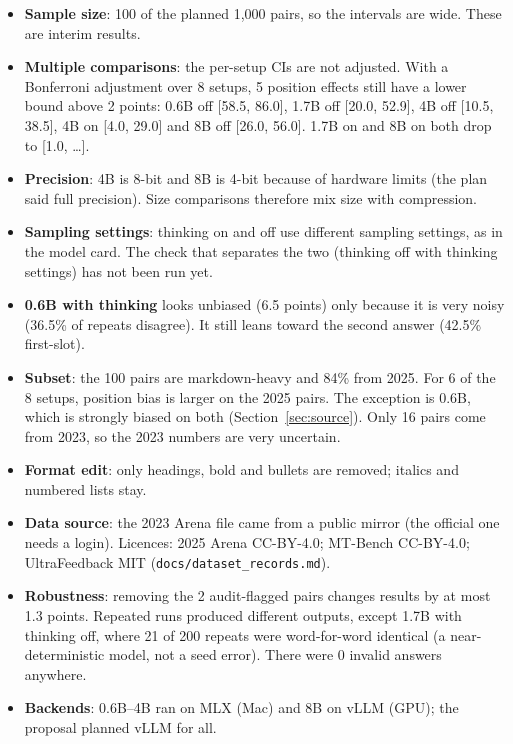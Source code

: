 \documentclass[10.5pt]{article}
\begin{document}
\begin{itemize}
\item \textbf{Sample size}: 100 of the planned 1{,}000 pairs, so the intervals are wide. These are interim results.
\item \textbf{Multiple comparisons}: the per-setup CIs are not adjusted. With a Bonferroni adjustment over 8 setups,
5 position effects still have a lower bound above 2 points: 0.6B off [58.5, 86.0], 1.7B off [20.0, 52.9], 4B off
[10.5, 38.5], 4B on [4.0, 29.0] and 8B off [26.0, 56.0]. 1.7B on and 8B on both drop to [1.0, \ldots].
\item \textbf{Precision}: 4B is 8-bit and 8B is 4-bit because of hardware limits (the plan said full precision).
Size comparisons therefore mix size with compression.
\item \textbf{Sampling settings}: thinking on and off use different sampling settings, as in the model card. The
check that separates the two (thinking off with thinking settings) has not been run yet.
\item \textbf{0.6B with thinking} looks unbiased (6.5 points) only because it is very noisy (36.5\% of repeats
disagree). It still leans toward the second answer (42.5\% first-slot).
\item \textbf{Subset}: the 100 pairs are markdown-heavy and 84\% from 2025. For 6 of the 8 setups, position bias
is larger on the 2025 pairs. The exception is 0.6B, which is strongly biased on both (Section~\ref{sec:source}).
Only 16 pairs come from 2023, so the 2023 numbers are very uncertain.
\item \textbf{Format edit}: only headings, bold and bullets are removed; italics and numbered lists stay.
\item \textbf{Data source}: the 2023 Arena file came from a public mirror (the official one needs a login). Licences:
2025 Arena CC-BY-4.0; MT-Bench CC-BY-4.0; UltraFeedback MIT (\texttt{docs/dataset\_records.md}).
\item \textbf{Robustness}: removing the 2 audit-flagged pairs changes results by at most 1.3 points. Repeated runs
produced different outputs, except 1.7B with thinking off, where 21 of 200 repeats were word-for-word identical
(a near-deterministic model, not a seed error). There were 0 invalid answers anywhere.
\item \textbf{Backends}: 0.6B--4B ran on MLX (Mac) and 8B on vLLM (GPU); the proposal planned vLLM for all.
\end{itemize}
\end{document}
